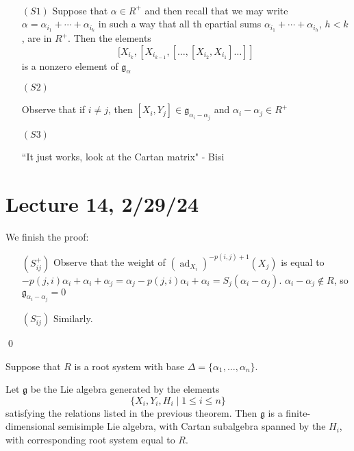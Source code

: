 \documentclass[x11names,reqno,14pt]{extarticle}
\newcommand{\mk}[1]{\mathfrak{#1}}
\newcommand{\g}{\mk{g}}
\DeclareMathOperator{\ad}{ad}
\begin{document}
\proof
\,

\begin{itemize}

\item[$(S1)$] Suppose that $\alpha \in R^+$ and then recall that we may write $\alpha = \alpha_{i_1} + \cdots + \alpha_{i_k}$ in such a way that all th epartial sums $\alpha_{i_1} + \cdots + \alpha_{i_h}$, $h < k$, are in $R^+$. Then the elements 
\[
[X_{i_k},[X_{i_{k-1}},[\dots,[X_{i_2},X_{i_1}]\dots]]
\]
is a nonzero element of $\g_\alpha$

\item[$(S2)$]

Observe that if $i\neq j$, then $[X_i,Y_j] \in \g_{\alpha_i-\alpha_j}$ and $\alpha_i-\alpha_j \in R^+$

\item[$(S3)$]

``It just works, look at the Cartan matrix" - Bisi

\end{itemize}

\section*{Lecture 14, 2/29/24}

We finish the proof: 

\begin{itemize}

\item[$(S_{ij}^+)$] Observe that the weight of $(\ad_{X_i})^{-p(i,j) + 1}(X_j)$ is equal to $-p(j,i)\alpha_i + \alpha_i + \alpha_j = \alpha_j - p(j,i)\alpha_i + \alpha_i = S_j(\alpha_i-\alpha_j)$. $\alpha_i-\alpha_j\not\in R$, so $\g_{\alpha_i-\alpha_j} = 0$

\item[$(S_{ij}^-)$] Similarly.

\end{itemize}

\qed

\thm[Serre]

Suppose that $R$ is a root system with base $\Delta = \{\alpha_1,\dots,\alpha_n\}$. 

Let $\g$ be the Lie algebra generated by the elements
\[
\{X_i, Y_i, H_i \mid 1\leq i \leq n\}
\]
satisfying the relations listed in the previous theorem. Then $\g$ is a finite-dimensional semisimple Lie algebra, with Cartan subalgebra spanned by the $H_i$, with corresponding root system equal to $R$. 
\end{document}

